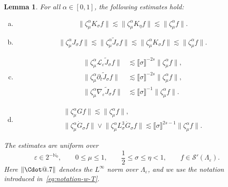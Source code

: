 \documentclass{article}
\makeatletter
\numberwithin{equation}{section}
\newcommand*\Cdot{{\mathpalette\Cdot@{.7}}}
\newcommand*\Cdot@[2]{\mathbin{\vcenter{\hbox{\scalebox{#2}{\hspace{0.1mm}$\m@th#1\bullet$\hspace{0.1mm}}}}}}
\theoremstyle{plain}
\newtheorem{lemma}[theorem]{Lemma}
\theoremstyle{definition}
\makeatother
\begin{document}
\begin{lemma}
  For all $\alpha \in [0,1]$, the following estimates hold:
  \begin{enumerate}[(a)]
    \setlength{\itemsep}{0.25em}
    \setlength{\parsep}{0pt}

    \item
    \[
      \bigl\| \zeta_{\mu}^{\alpha} K_{\sigma} f \bigr\|
      \lesssim
      \bigl\| \zeta_{\mu}^{\alpha} K_{\eta} f \bigr\|
      \lesssim
      \bigl\| \zeta_{\mu}^{\alpha} f \bigr\|.
    \]
    \item
    \[
      \bigl\| \zeta_{\mu}^{\alpha} J_{\sigma} f \bigr\|
      \lesssim
      \bigl\| \zeta_{\mu}^{\alpha} \tilde J_{\sigma} f \bigr\|
      \lesssim
      \bigl\| \zeta_{\mu}^{\alpha} K_{\sigma} f \bigr\|
      \lesssim
      \bigl\| \zeta_{\mu}^{\alpha} f \bigr\|.
    \]
    \item
    \[
      \begin{aligned}
        \bigl\| \zeta_{\mu}^{\alpha}
        \mathcal L_{\varepsilon} \tilde J_{\sigma} f \bigr\|
        &\lesssim
        \llbracket \sigma \rrbracket^{-2s}
        \bigl\| \zeta_{\mu}^{\alpha} f \bigr\|, \\
        \bigl\| \zeta_{\mu}^{\alpha}
        \partial_t \tilde J_{\sigma} f \bigr\|
        &\lesssim
        \llbracket \sigma \rrbracket^{-2s}
        \bigl\| \zeta_{\mu}^{\alpha} f \bigr\|, \\
        \bigl\| \zeta_{\mu}^{\alpha}
        \nabla_{\varepsilon} \tilde J_{\sigma} f \bigr\|
        &\lesssim
        \llbracket \sigma \rrbracket^{-1}
        \bigl\| \zeta_{\mu}^{\alpha} f \bigr\|.
      \end{aligned}
    \]
    \item
    \[
      \begin{gathered}
        \bigl\| \zeta_{\mu}^{\alpha} G f \bigr\|
        \lesssim
        \bigl\| \zeta_{\mu}^{\alpha} f \bigr\|,
        \\
        \bigl\| \zeta_{\mu}^{\alpha} \dot G_{\sigma} f \bigr\|
        \vee
        \bigl\| \zeta_{\mu}^{\alpha}
        L_{\sigma}^{3} \dot G_{\sigma} f \bigr\|
        \lesssim
        \llbracket \sigma \rrbracket^{2s-1}
        \bigl\| \zeta_{\mu}^{\alpha} f \bigr\|.
      \end{gathered}
    \]
  \end{enumerate}
  The estimates are uniform over
  \[
    \varepsilon \in 2^{-\mathbb N_0},
    \qquad
    0 \leqslant \mu \leqslant 1,
    \qquad
    \frac12 \leqslant \sigma \leqslant \eta < 1,
    \qquad
    f \in \mathcal S'(\Lambda_{\varepsilon}).
  \]
  Here $\| \Cdot \|$ denotes the $L^{\infty}$ norm over
  $\Lambda_{\varepsilon}$, and we use the notation introduced
  in~\eqref{eq:notation-w-T}.
\end{lemma}
\end{document}
